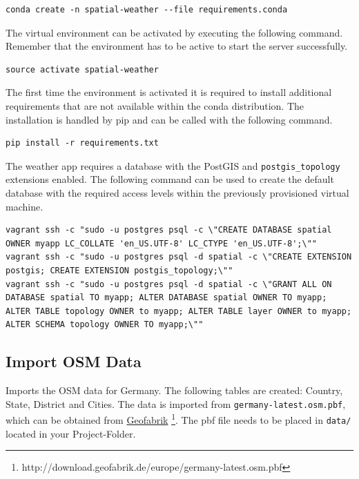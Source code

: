 \documentclass[paper=a4, fontsize=11pt]{article} %
\numberwithin{equation}{section} %
\numberwithin{figure}{section} %
\numberwithin{table}{section} %
\begin{document}
\begin{lstlisting}
conda create -n spatial-weather --file requirements.conda
\end{lstlisting}

The virtual environment can be activated by executing the following command.
Remember that the environment has to be active to start the server successfully.
\begin{lstlisting}
source activate spatial-weather
\end{lstlisting}

The first time the environment is activated it is required to install additional
requirements that are not available within the conda distribution. The installation
is handled by pip and can be called with the following command.
\begin{lstlisting}
pip install -r requirements.txt
\end{lstlisting}

The weather app requires a database with the PostGIS and \texttt{postgis\_topology} extensions enabled.
The following command can be used to create the default database with the required
access levels within the previously provisioned virtual machine.
\begin{lstlisting}[breaklines=true]
vagrant ssh -c "sudo -u postgres psql -c \"CREATE DATABASE spatial OWNER myapp LC_COLLATE 'en_US.UTF-8' LC_CTYPE 'en_US.UTF-8';\""
vagrant ssh -c "sudo -u postgres psql -d spatial -c \"CREATE EXTENSION postgis; CREATE EXTENSION postgis_topology;\""
vagrant ssh -c "sudo -u postgres psql -d spatial -c \"GRANT ALL ON DATABASE spatial TO myapp; ALTER DATABASE spatial OWNER TO myapp; ALTER TABLE topology OWNER to myapp; ALTER TABLE layer OWNER to myapp; ALTER SCHEMA topology OWNER TO myapp;\""
\end{lstlisting}

\subsection{Import OSM Data}\label{import-osm-data}

Imports the OSM data for Germany. The following tables are created: Country, State, District and Cities. The data is imported from \texttt{germany-latest.osm.pbf}, which can be obtained from \href{http://download.geofabrik.de/europe/germany-latest.osm.pbf}{Geofabrik} \footnote{http://download.geofabrik.de/europe/germany-latest.osm.pbf}. The pbf file needs to be placed in \texttt{data/} located in your Project-Folder.
\end{document}
